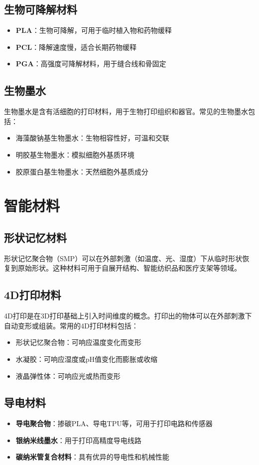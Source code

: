 \documentclass[12pt,UTF8]{ctexbook}
\begin{document}
\subsection{生物可降解材料}
\begin{itemize}
\item \textbf{PLA}：生物可降解，可用于临时植入物和药物缓释
\item \textbf{PCL}：降解速度慢，适合长期药物缓释
\item \textbf{PGA}：高强度可降解材料，用于缝合线和骨固定
\end{itemize}

\subsection{生物墨水}
生物墨水是含有活细胞的打印材料，用于生物打印组织和器官。常见的生物墨水包括：
\begin{itemize}
\item 海藻酸钠基生物墨水：生物相容性好，可温和交联
\item 明胶基生物墨水：模拟细胞外基质环境
\item 胶原蛋白基生物墨水：天然细胞外基质成分
\end{itemize}

\section{智能材料}

\subsection{形状记忆材料}
形状记忆聚合物（SMP）可以在外部刺激（如温度、光、湿度）下从临时形状恢复到原始形状。这种材料可用于自展开结构、智能纺织品和医疗支架等领域。

\subsection{4D打印材料}
4D打印是在3D打印基础上引入时间维度的概念。打印出的物体可以在外部刺激下自动变形或组装。常用的4D打印材料包括：
\begin{itemize}
\item 形状记忆聚合物：可响应温度变化而变形
\item 水凝胶：可响应湿度或pH值变化而膨胀或收缩
\item 液晶弹性体：可响应光或热而变形
\end{itemize}

\subsection{导电材料}
\begin{itemize}
\item \textbf{导电聚合物}：掺碳PLA、导电TPU等，可用于打印电路和传感器
\item \textbf{银纳米线墨水}：用于打印高精度导电线路
\item \textbf{碳纳米管复合材料}：具有优异的导电性和机械性能
\end{itemize}
\end{document}
